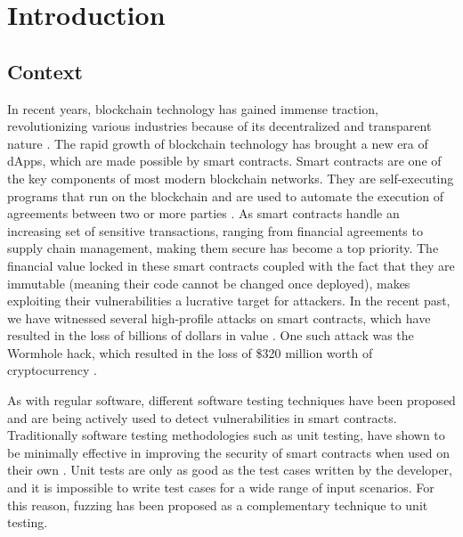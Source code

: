 
\chapter{Introduction}\label{chapter:introduction}
\section*{Context}
In recent years, blockchain technology has gained immense traction, revolutionizing various industries because of its decentralized and transparent nature \cite{noauthor_global_nodate}.
The rapid growth of blockchain technology has brought a new era of \acp{dApp}, which are made possible by smart contracts.
Smart contracts are one of the key components of most modern blockchain networks.
They are self-executing programs that run on the blockchain and are used to automate the execution of agreements between two or more parties \cite{zou_smart_2021}.
As smart contracts handle an increasing set of sensitive transactions, ranging from financial agreements to supply chain management, making them secure has become a top priority.
The financial value locked in these smart contracts coupled with the fact that they are immutable (meaning their code cannot be changed once deployed), makes exploiting their vulnerabilities a lucrative target for attackers.
In the recent past, we have witnessed several high-profile attacks on smart contracts, which have resulted in the loss of billions of dollars in value  \cite{noauthor_funds_nodate}.
One such attack was the Wormhole hack, which resulted in the loss of \$320 million worth of cryptocurrency \cite{faife_wormhole_2022}.

As with regular software, different software testing techniques have been proposed and are being actively used to detect vulnerabilities in smart contracts.
Traditionally software testing methodologies such as unit testing, have shown to be minimally effective in improving the security of smart contracts when used on their own \cite{noauthor_smart_nodate}.
Unit tests are only as good as the test cases written by the developer, and it is impossible to write test cases for a wide range of input scenarios.
For this reason, fuzzing has been proposed as a complementary technique to unit testing.

